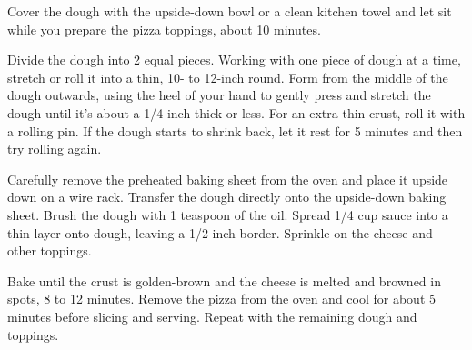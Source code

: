 \begin{recipe}
	Cover the dough with the upside-down bowl or a clean kitchen towel and let sit while you prepare the pizza toppings, about 10 minutes.
	
	Divide the dough into 2 equal pieces. Working with one piece of dough at a time, stretch or roll it into a thin, 10- to 12-inch round. Form from the middle of the dough outwards, using the heel of your hand to gently press and stretch the dough until it's about a 1/4-inch thick or less. For an extra-thin crust, roll it with a rolling pin. If the dough starts to shrink back, let it rest for 5 minutes and then try rolling again.
	
	Carefully remove the preheated baking sheet from the oven and place it upside down on a wire rack. Transfer the dough directly onto the upside-down baking sheet. Brush the dough with 1 teaspoon of the oil. Spread 1/4 cup sauce into a thin layer onto dough, leaving a 1/2-inch border. Sprinkle on the cheese and other toppings.
	
	Bake until the crust is golden-brown and the cheese is melted and browned in spots, 8 to 12 minutes. Remove the pizza from the oven and cool for about 5 minutes before slicing and serving. Repeat with the remaining dough and toppings. 
	
	
	
\end{recipe}
